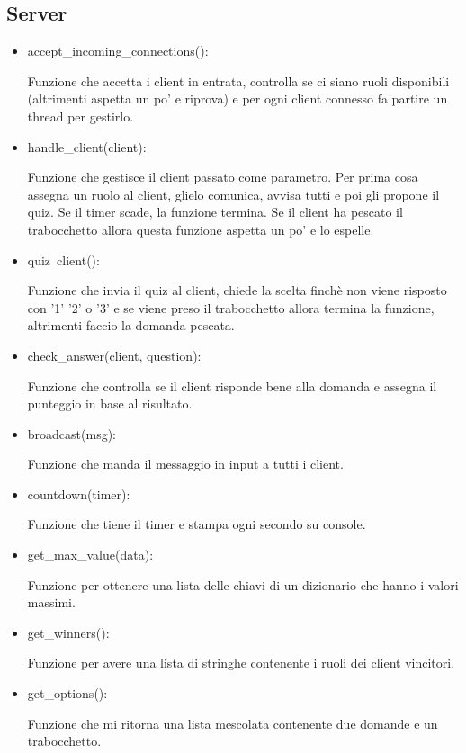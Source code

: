 \documentclass[a4paper,12pt]{report}
\begin{document}
\subsection{Server}
\begin{itemize}
	\item accept\_incoming\_connections():
	
	Funzione che accetta i client in entrata, controlla se ci siano ruoli disponibili (altrimenti aspetta
	 un po' e riprova) e per ogni client connesso fa partire un thread per gestirlo.
	\item handle\_client(client): 
	
	Funzione che gestisce il client passato come parametro. Per prima cosa assegna un ruolo al client,
	glielo comunica, avvisa tutti e poi gli propone il quiz. Se il timer scade, la funzione termina.
	Se il client ha pescato il trabocchetto allora questa funzione aspetta un po' e lo espelle.
	\item quiz\ client():
	
	Funzione che invia il quiz al client, chiede la scelta finchè non viene risposto con '1' '2' o '3'
	e se viene preso il trabocchetto allora termina la funzione, altrimenti faccio la domanda pescata.
	\item check\_answer(client, question):
	
	Funzione che controlla se il client risponde bene alla domanda e assegna il punteggio in base al risultato.
	\item broadcast(msg):
	
	Funzione che manda il messaggio in input a tutti i client.
	\item countdown(timer):
	
	Funzione che tiene il timer e stampa ogni secondo su console.
	\item get\_max\_value(data):
	
	Funzione per ottenere una lista delle chiavi di un dizionario che hanno i valori massimi.
	\item get\_winners():
	
	Funzione per avere una lista di stringhe contenente i ruoli dei client vincitori.
	\item get\_options():
	
	Funzione che mi ritorna una lista mescolata contenente due domande e un trabocchetto.
\end{itemize}
\end{document}
